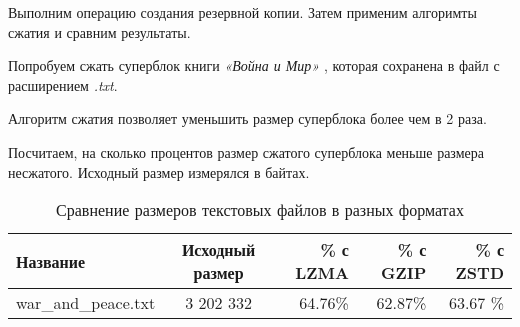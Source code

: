 Выполним операцию создания резервной копии. Затем применим алгоримты сжатия и сравним результаты.  



%

Попробуем сжать суперблок книги \textit{«Война и Мир»
}, которая сохранена в файл с расширением \textit{.txt}. 


Алгоритм сжатия позволяет уменьшить размер суперблока более чем в 2 раза.

Посчитаем, на сколько процентов размер сжатого суперблока меньше размера несжатого.  
Исходный размер измерялся в байтах.  
\begin{table}[h]
\centering
\caption{Сравнение размеров текстовых файлов в разных форматах}
\begin{tabular}{|l|c|r|r|r|}
\hline
Название & Исходный размер & \% с LZMA & \% с GZIP & \% с ZSTD \\
\hline
war\_and\_peace.txt & 3 202 332 & 64.76\% & 62.87\% & 63.67
\% \\
\hline
\end{tabular}
\end{table}


